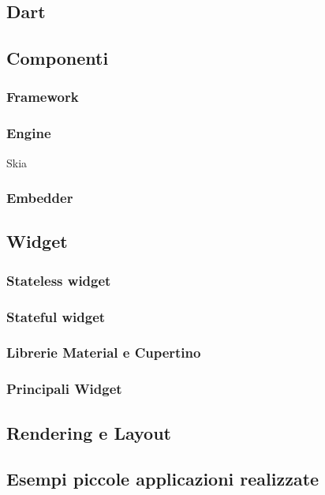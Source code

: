\subsection{Dart}

\subsection{Componenti}

\subsubsection{Framework}

\subsubsection{Engine}
Skia
\subsubsection{Embedder}

\subsection{Widget}

\subsubsection{Stateless widget}

\subsubsection{Stateful widget}

\subsubsection{Librerie Material e Cupertino}

\subsubsection{Principali Widget}

\subsection{Rendering e Layout}

\subsection{Esempi piccole applicazioni realizzate}

